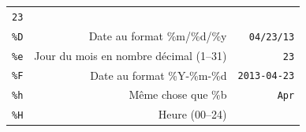 \documentclass[12pt,]{book}
\numberwithin{equation}{section}
\numberwithin{countremarque}{section}
\begin{document}
\begin{longtable}[]{@{}rrr@{}}
\begin{minipage}[t]{0.22\columnwidth}
\texttt{23}\strut
\end{minipage}\tabularnewline
\begin{minipage}[t]{0.10\columnwidth}\raggedleft\strut
\texttt{\%D}\strut
\end{minipage} & \begin{minipage}[t]{0.60\columnwidth}\raggedleft\strut
Date au format \%m/\%d/\%y\strut
\end{minipage} & \begin{minipage}[t]{0.22\columnwidth}\raggedleft\strut
\texttt{04/23/13}\strut
\end{minipage}\tabularnewline
\begin{minipage}[t]{0.10\columnwidth}\raggedleft\strut
\texttt{\%e}\strut
\end{minipage} & \begin{minipage}[t]{0.60\columnwidth}\raggedleft\strut
Jour du mois en nombre décimal (1--31)\strut
\end{minipage} & \begin{minipage}[t]{0.22\columnwidth}\raggedleft\strut
\texttt{23}\strut
\end{minipage}\tabularnewline
\begin{minipage}[t]{0.10\columnwidth}\raggedleft\strut
\texttt{\%F}\strut
\end{minipage} & \begin{minipage}[t]{0.60\columnwidth}\raggedleft\strut
Date au format \%Y-\%m-\%d\strut
\end{minipage} & \begin{minipage}[t]{0.22\columnwidth}\raggedleft\strut
\texttt{2013-04-23}\strut
\end{minipage}\tabularnewline
\begin{minipage}[t]{0.10\columnwidth}\raggedleft\strut
\texttt{\%h}\strut
\end{minipage} & \begin{minipage}[t]{0.60\columnwidth}\raggedleft\strut
Même chose que \%b\strut
\end{minipage} & \begin{minipage}[t]{0.22\columnwidth}\raggedleft\strut
\texttt{Apr}\strut
\end{minipage}\tabularnewline
\begin{minipage}[t]{0.10\columnwidth}\raggedleft\strut
\texttt{\%H}\strut
\end{minipage} & \begin{minipage}[t]{0.60\columnwidth}\raggedleft\strut
Heure (00--24)\strut
\end{minipage} & \begin{minipage}[t]{0.22\columnwidth}\raggedleft\strut

\end{minipage}
\end{longtable}
\end{document}
